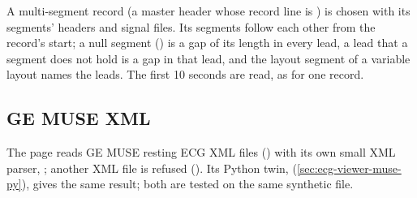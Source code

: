 A multi-segment record (a master header whose record line is ) is chosen with its
segments' headers and signal files. Its segments follow each other from the record's start; a
null segment (\code{\textasciitilde}) is a gap of its length in every lead, a lead that a segment
does not hold is a gap in that lead, and the layout segment of a variable layout names the leads.
The first 10 seconds are read, as for one record.

\subsection{GE MUSE XML}
\label{sec:ecg-viewer-muse}

The page reads GE MUSE resting ECG XML files () with its own small XML parser,
; another XML file is refused (). Its Python twin,  (\cref{sec:ecg-viewer-muse-py}), gives the same
result; both are tested on the same synthetic file.

